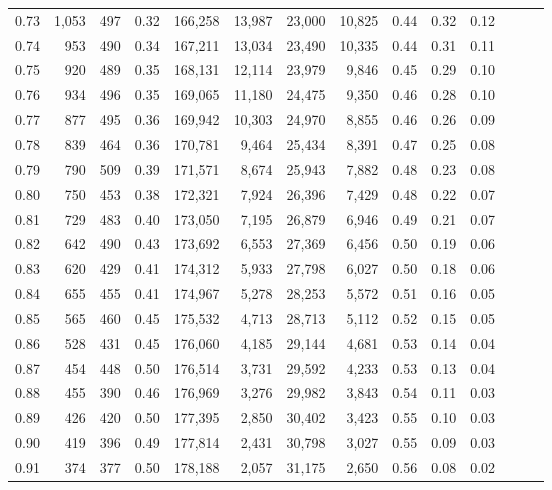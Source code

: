 \begin{tabular}{rrrrrrrrrrrrrr}
0.73 &  1,053 &  497 &  0.32 &  166,258 &   13,987 &  23,000 &  10,825 &  0.44 &  0.32 &      0.12 \\
0.74 &    953 &  490 &  0.34 &  167,211 &   13,034 &  23,490 &  10,335 &  0.44 &  0.31 &      0.11 \\
0.75 &    920 &  489 &  0.35 &  168,131 &   12,114 &  23,979 &   9,846 &  0.45 &  0.29 &      0.10 \\
0.76 &    934 &  496 &  0.35 &  169,065 &   11,180 &  24,475 &   9,350 &  0.46 &  0.28 &      0.10 \\
0.77 &    877 &  495 &  0.36 &  169,942 &   10,303 &  24,970 &   8,855 &  0.46 &  0.26 &      0.09 \\
0.78 &    839 &  464 &  0.36 &  170,781 &    9,464 &  25,434 &   8,391 &  0.47 &  0.25 &      0.08 \\
0.79 &    790 &  509 &  0.39 &  171,571 &    8,674 &  25,943 &   7,882 &  0.48 &  0.23 &      0.08 \\
0.80 &    750 &  453 &  0.38 &  172,321 &    7,924 &  26,396 &   7,429 &  0.48 &  0.22 &      0.07 \\
0.81 &    729 &  483 &  0.40 &  173,050 &    7,195 &  26,879 &   6,946 &  0.49 &  0.21 &      0.07 \\
0.82 &    642 &  490 &  0.43 &  173,692 &    6,553 &  27,369 &   6,456 &  0.50 &  0.19 &      0.06 \\
0.83 &    620 &  429 &  0.41 &  174,312 &    5,933 &  27,798 &   6,027 &  0.50 &  0.18 &      0.06 \\
0.84 &    655 &  455 &  0.41 &  174,967 &    5,278 &  28,253 &   5,572 &  0.51 &  0.16 &      0.05 \\
0.85 &    565 &  460 &  0.45 &  175,532 &    4,713 &  28,713 &   5,112 &  0.52 &  0.15 &      0.05 \\
0.86 &    528 &  431 &  0.45 &  176,060 &    4,185 &  29,144 &   4,681 &  0.53 &  0.14 &      0.04 \\
0.87 &    454 &  448 &  0.50 &  176,514 &    3,731 &  29,592 &   4,233 &  0.53 &  0.13 &      0.04 \\
0.88 &    455 &  390 &  0.46 &  176,969 &    3,276 &  29,982 &   3,843 &  0.54 &  0.11 &      0.03 \\
0.89 &    426 &  420 &  0.50 &  177,395 &    2,850 &  30,402 &   3,423 &  0.55 &  0.10 &      0.03 \\
0.90 &    419 &  396 &  0.49 &  177,814 &    2,431 &  30,798 &   3,027 &  0.55 &  0.09 &      0.03 \\
0.91 &    374 &  377 &  0.50 &  178,188 &    2,057 &  31,175 &   2,650 &  0.56 &  0.08 &      0.02 \\

\end{tabular}
